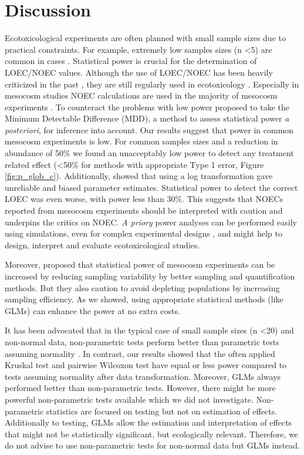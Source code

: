 \documentclass{scrartcl}
\begin{document}
\section{Discussion}
\label{sec:disc}
Ecotoxicological experiments are often planned with small sample sizes due to practical constraints. 
For example, extremely low samples sizes (n \textless 5) are common in cases \citep{sanderson_pesticide_2002,szocs_analysing_2015}.
Statistical power is crucial for the determination of LOEC/NOEC values.
Although the use of LOEC/NOEC has been heavily criticized in the past \citep{landis_well_2011},  they are still regularly used in ecotoxicology \citep{jager_bad_2012}.
Especially in mesocosm studies NOEC calculations are used in the majority of mesocosm experiments \citep{brock_minimum_2015,efsa_ppr_guidance_2013}.
To counteract the problems with low power \citet{brock_minimum_2015} proposed to take the Minimum Detectable Difference (MDD), a method to assess statistical power \emph{a posteriori}, for inference into account.
Our results suggest that power in common mesocosm experiments is low.
For common samples sizes and a reduction in abundance of 50\% we found an unacceptably low power to detect any treatment related effect (\textless 50\% for methods with appropriate Type 1 error, Figure \ref{fig:p_glob_c}).
Additionally, \citet{ohara_not_2010} showed that using a log transformation gave unreliable and biased parameter estimates.
Statistical power to detect the correct LOEC was even worse, with power less than 30\%.
This suggests that NOECs reported from mesocosm experiments should be interpreted with caution and underpins the critics on NOEC.
\emph{A priory} power analyses can be performed easily using simulations, even for complex experimental designs \citep{johnson_power_2014}, and might help to design, interpret and evaluate ecotoxicological studies.

Moreover, \citet{brock_minimum_2015} proposed that statistical power of mesocosm experiments can be increased by reducing sampling variability by better sampling and quantification methods. 
But they also caution to avoid depleting populations by increasing sampling efficiency.
As we showed, using appropriate statistical methods (like GLMs) can enhance the power at no extra costs.

It has been advocated that in the typical case of small sample sizes (n \textless 20) and non-normal data, non-parametric tests perform better than parametric tests assuming normality \citep{wang_making_2011}.
In contrast, our results showed that the often applied Kruskal test and pairwise Wilcoxon test have equal or less power compared to tests assuming normality after data transformation.
Moreover, GLMs always performed better than non-parametric tests. 
However, there might be more powerful non-parametric tests available \citep{konietschke_rank-based_2012} which we did not investigate.
Non-parametric statistics are focused on testing but not on estimation of effects.
Additionally to testing, GLMs allow the estimation and interpretation of effects that might not be statistically significant, but ecologically relevant.
Therefore, we do not advise to use non-parametric tests for non-normal data but GLMs instead.
\end{document}
